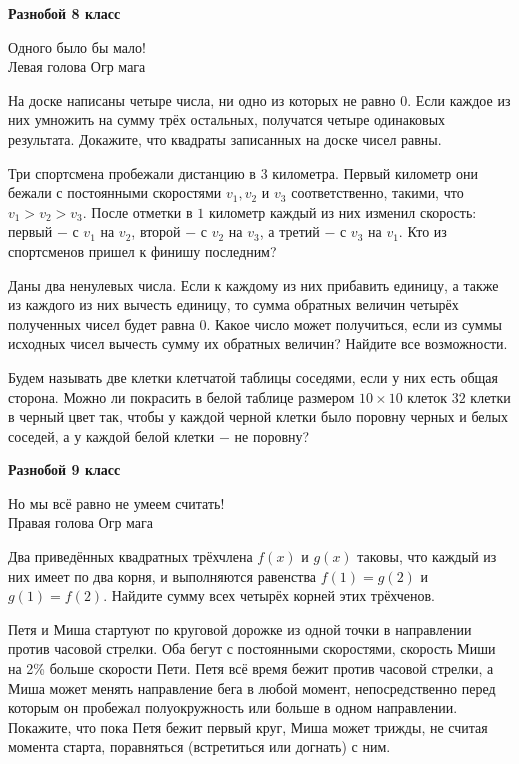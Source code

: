 \hspace{3mm}

\centerline{\bf \Huge Разнобой 8 класс}

\begin{flushright}
        \scriptsize{ Одного было бы мало! \\ Левая голова Огр мага}
\end{flushright}

На доске написаны четыре числа, ни одно из которых не равно $0$. Если каждое из них умножить на сумму трёх остальных, получатся четыре одинаковых результата. Докажите, что квадраты записанных на доске чисел равны.

Три спортсмена пробежали дистанцию в $3$ километра. Первый километр они бежали с постоянными скоростями $v_1, v_2$ и $v_3$ соответственно, такими, что $v_1 > v_2 > v_3$. После отметки в $1$ километр каждый из них изменил скорость: первый $-$ с $v_1$ на $v_2$, второй $-$ с $v_2$ на $v_3$, а третий $-$ с $v_3$ на $v_1$. Кто из спортсменов пришел к финишу последним?

Даны два ненулевых числа. Если к каждому из них прибавить единицу, а также из каждого из них вычесть единицу, то сумма обратных величин четырёх полученных чисел будет равна 0. Какое число может получиться, если из суммы исходных чисел вычесть сумму их обратных величин? Найдите все возможности.

Будем называть две клетки клетчатой таблицы соседями, если у них есть общая сторона. Можно ли покрасить в белой таблице размером $10 \times 10$ клеток $32$ клетки в черный цвет так, чтобы у каждой черной клетки было поровну черных и белых соседей, а у каждой белой клетки $-$ не поровну?


\newpage

\hspace{3mm}

\centerline{\bf \Huge Разнобой 9 класс}

\begin{flushright}
        \scriptsize{Но мы всё равно не умеем считать!\\ Правая голова Огр мага
}
\end{flushright}
 
Два приведённых квадратных трёхчлена $f(x)$ и $g(x)$ таковы, что каждый из них имеет по два корня, и выполняются равенства $f(1) = g(2)$ и $g(1) = f(2)$. Найдите сумму всех четырёх корней этих трёхченов.

Петя и Миша стартуют по круговой дорожке из одной точки в направлении против часовой стрелки. Оба бегут с постоянными скоростями, скорость Миши на 2\% больше скорости Пети. Петя всё время бежит против часовой стрелки, а Миша может менять направление бега в любой момент, непосредственно перед которым он пробежал полуокружность или больше в одном направлении. Покажите, что пока Петя бежит первый круг, Миша может трижды, не считая момента старта, поравняться (встретиться или догнать) с ним.

